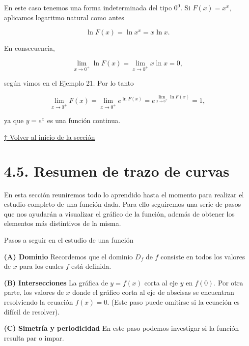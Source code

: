 \documentclass[
  letterpaper,
]{book}
\theoremstyle{plain}
\theoremstyle{remark}
\begin{document}
\begin{tcolorbox}[enhanced jigsaw, opacityback=0, left=2mm, opacitybacktitle=0.6, toprule=.15mm, bottomrule=.15mm, colbacktitle=quarto-callout-tip-color!10!white, titlerule=0mm, bottomtitle=1mm, title=\textcolor{quarto-callout-tip-color}{\faLightbulb}\hspace{0.5em}{Solución}, toptitle=1mm, colframe=quarto-callout-tip-color-frame, colback=white, breakable, rightrule=.15mm, arc=.35mm, leftrule=.75mm, coltitle=black]

En este caso tenemos una forma indeterminada del tipo \(0^0\). Si
\(F(x)=x^x\), aplicamos logaritmo natural como antes

\[
\ln F(x)=\ln x^x=x\ln x.
\]

En consecuencia,

\[
\lim_{x\to 0^+} \ln F(x)=\lim_{x\to 0^+} x\ln x=0,
\]

según vimos en el Ejemplo 21. Por lo tanto

\[
\lim_{x\to 0^+} F(x)=\lim_{x\to 0^+} e^{\ln F(x)}=e^{\lim_{x\to 0^+} \ln F(x)}=1,
\]

ya que \(y=e^x\) es una función continua.

\end{tcolorbox}

\hyperref[seccion_4.4]{↑ Volver al inicio de la sección}

\section{4.5. Resumen de trazo de curvas}\label{seccion_4.5}

En esta sección reuniremos todo lo aprendido hasta el momento para
realizar el estudio completo de una función dada. Para ello seguiremos
una serie de pasos que nos ayudarán a visualizar el gráfico de la
función, además de obtener los elementos más distintivos de la misma.

Pasos a seguir en el estudio de una función

\textbf{(A) Dominio} Recordemos que el dominio \(D_f\) de \(f\) consiste
en todos los valores de \(x\) para los cuales \(f\) está definida.

\textbf{(B) Intersecciones} La gráfica de \(y=f(x)\) corta al eje \(y\)
en \(f(0)\). Por otra parte, los valores de \(x\) donde el gráfico corta
al eje de abscisas se encuentran resolviendo la ecuación \(f(x)=0\).
(Este paso puede omitirse si la ecuación es difícil de resolver).

\textbf{(C) Simetría y periodicidad} En este paso podemos investigar si
la función resulta par o impar.
\end{document}
